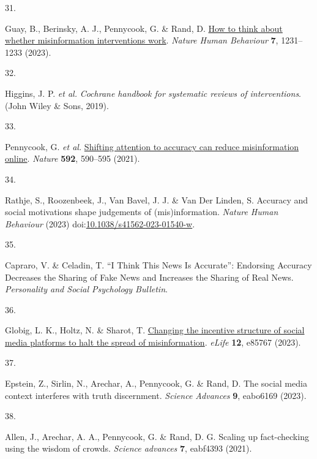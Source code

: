 \documentclass[
  doc,floatsintext]{apa6}
\newlength{\cslhangindent}
\newlength{\csllabelwidth}
\newenvironment{CSLReferences}[2] %
 {\begin{list}{}{%
  \setlength{\itemindent}{0pt}
  \setlength{\leftmargin}{0pt}
  \setlength{\parsep}{0pt}
  \ifodd #1
   \setlength{\leftmargin}{\cslhangindent}
   \setlength{\itemindent}{-1\cslhangindent}
  \fi
  \setlength{\itemsep}{#2\baselineskip}}}
 {\end{list}}
\newcommand{\CSLLeftMargin}[1]{\parbox[t]{\csllabelwidth}{\strut#1\strut}}
\newcommand{\CSLRightInline}[1]{\parbox[t]{\linewidth - \csllabelwidth}{\strut#1\strut}}
\begin{document}
\begin{CSLReferences}{0}{0}
\CSLLeftMargin{31. }%
\CSLRightInline{Guay, B., Berinsky, A. J., Pennycook, G. \& Rand, D. \href{https://doi.org/10.1038/s41562-023-01667-w}{How to think about whether misinformation interventions work}. \emph{Nature Human Behaviour} \textbf{7}, 1231--1233 (2023).}

\CSLLeftMargin{32. }%
\CSLRightInline{Higgins, J. P. \emph{et al.} \emph{Cochrane handbook for systematic reviews of interventions}. (John Wiley \& Sons, 2019).}

\CSLLeftMargin{33. }%
\CSLRightInline{Pennycook, G. \emph{et al.} \href{https://doi.org/10.1038/s41586-021-03344-2}{Shifting attention to accuracy can reduce misinformation online}. \emph{Nature} \textbf{592}, 590--595 (2021).}

\CSLLeftMargin{34. }%
\CSLRightInline{Rathje, S., Roozenbeek, J., Van Bavel, J. J. \& Van Der Linden, S. Accuracy and social motivations shape judgements of (mis)information. \emph{Nature Human Behaviour} (2023) doi:\href{https://doi.org/10.1038/s41562-023-01540-w}{10.1038/s41562-023-01540-w}.}

\CSLLeftMargin{35. }%
\CSLRightInline{Capraro, V. \& Celadin, T. {``}I Think This News Is Accurate{''}: Endorsing Accuracy Decreases the Sharing of Fake News and Increases the Sharing of Real News. \emph{Personality and Social Psychology Bulletin}.}

\CSLLeftMargin{36. }%
\CSLRightInline{Globig, L. K., Holtz, N. \& Sharot, T. \href{https://doi.org/10.7554/eLife.85767}{Changing the incentive structure of social media platforms to halt the spread of misinformation}. \emph{eLife} \textbf{12}, e85767 (2023).}

\CSLLeftMargin{37. }%
\CSLRightInline{*Epstein, Z., Sirlin, N., Arechar, A., Pennycook, G. \& Rand, D. The social media context interferes with truth discernment. \emph{Science Advances} \textbf{9}, eabo6169 (2023).}

\CSLLeftMargin{38. }%
\CSLRightInline{*Allen, J., Arechar, A. A., Pennycook, G. \& Rand, D. G. Scaling up fact-checking using the wisdom of crowds. \emph{Science advances} \textbf{7}, eabf4393 (2021).}


\end{CSLReferences}
\end{document}
